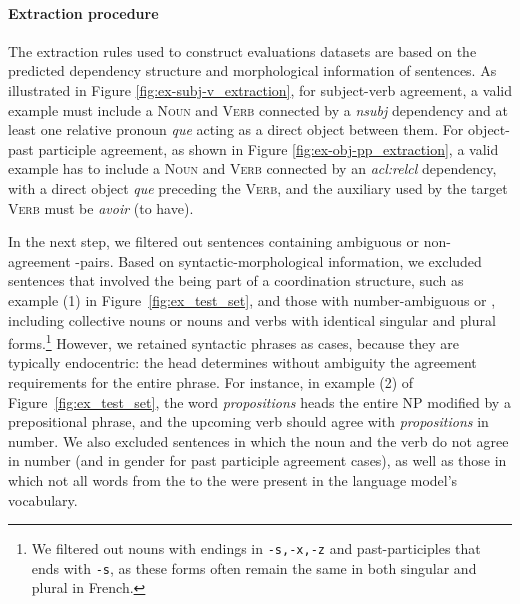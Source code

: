 \paragraph{Extraction procedure} The extraction rules used to construct evaluations datasets are based on the predicted dependency structure and morphological information of sentences. As illustrated in Figure \ref{fig:ex-subj-v_extraction}, for subject-verb agreement, a valid example must include a \textsc{Noun} and \textsc{Verb} connected by a \textit{nsubj} dependency and at least one relative pronoun \textit{que} acting as a direct object between them. For object-past participle agreement, as shown in Figure \ref{fig:ex-obj-pp_extraction}, a valid example has to include a
\textsc{Noun} and \textsc{Verb} connected by an \textit{acl:relcl}
dependency, with a direct object \textit{que} preceding the \textsc{Verb}, and the
auxiliary used by the target \textsc{Verb} must be \textit{avoir}
(to have). 

  
In the next step, we filtered out sentences containing ambiguous or non-agreement \target-\cue pairs. Based on syntactic-morphological information, we excluded
sentences that involved the \cue being part of a coordination structure, such as example (1) in Figure~\ref{fig:ex_test_set}, and those with number-ambiguous \cue or \target, including collective nouns or nouns and verbs with identical singular and plural forms.\footnote{We filtered out nouns with endings in \texttt{-s,-x,-z} and past-participles that ends with \texttt{-s}, as these forms often remain the same in both singular and plural in French.} However, we retained syntactic phrases as \cue cases, 
because they are typically endocentric: the head determines without ambiguity the agreement requirements for the entire phrase. For instance, in example (2) of Figure~\ref{fig:ex_test_set}, the word \textit{propositions} heads the entire NP modified by a prepositional phrase, and the upcoming verb should agree with \textit{propositions} in number. We also excluded sentences in which the noun and the verb do not agree in number (and in gender for past participle agreement cases), as well as those in which not all words from the \cue to the \target were present in the language model's
vocabulary. 

